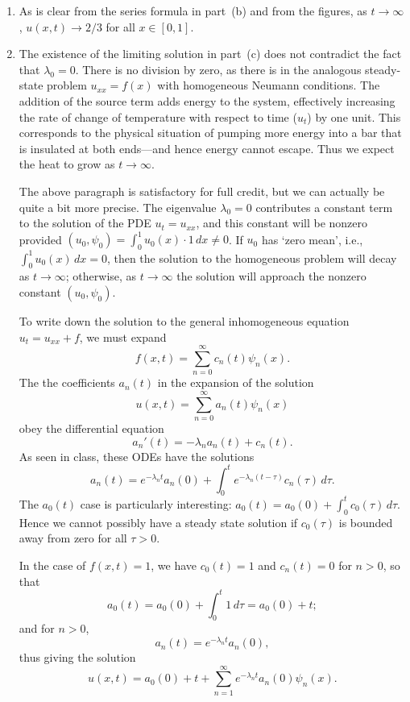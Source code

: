 {\begin{solution}
\begin{enumerate}
\item As is clear from the series formula in part~(b) and from the figures,
      as $t\to\infty$, $u(x,t) \to 2/3$ for all $x\in[0,1]$.

\item The existence of the limiting solution in part~(c) does not contradict
      the fact that $\lambda_0=0$.  There is no division by zero, as there is
      in the analogous steady-state problem $u_{xx} = f(x)$ with homogeneous
      Neumann conditions.  The addition of the source term adds energy to the
      system, effectively increasing the rate of change of temperature with 
      respect to time ($u_t$) by one unit.  
      This corresponds to the physical situation of pumping more
      energy into a bar that is insulated at both ends---and hence
      energy cannot escape.  Thus we expect the heat to grow as $t\to\infty$.

      The above paragraph is satisfactory for full credit, but we can actually
      be quite a bit more precise.  The eigenvalue $\lambda_0=0$ contributes
      a constant term to the solution of the PDE $u_t=u_{xx}$, and this constant 
      will be nonzero provided $(u_0,\psi_0) = \int_0^1 u_0(x)\cdot 1 \, dx \ne 0$.
      If $u_0$ has `zero mean', i.e., $\int_0^1 u_0(x)\,dx = 0$, then the solution
      to the homogeneous problem will decay as $t\to\infty$; otherwise, as $t\to\infty$
      the solution will approach the nonzero constant $(u_0,\psi_0)$.

      To write down the solution to the general inhomogeneous equation $u_t = u_{xx} + f$,
      we must expand
      \[ f(x,t) = \sum_{n=0}^\infty c_n(t) \psi_n(x).\]
      The the coefficients $a_n(t)$ in the expansion of the solution
      \[ u(x,t) = \sum_{n=0}^\infty a_n(t) \psi_n(x)\]
      obey the differential equation
      \[ a_n'(t) = -\lambda_n a_n(t) + c_n(t).\]
      As seen in class, these ODEs have the solutions
      \[ a_n(t) = e^{-\lambda_n t} a_n(0) + \int_0^t e^{-\lambda_n (t-\tau)} c_n(\tau)\,d\tau.\]
      The $a_0(t)$ case is particularly interesting: $a_0(t) = a_0(0) + \int_0^t c_0(\tau)\, d\tau$.
      Hence we cannot possibly have a steady state solution if $c_0(\tau)$ is bounded away from zero for all $\tau>0$.
 
      In the case of $f(x,t) = 1$, we have $c_0(t) = 1$ and $c_n(t) = 0$ for $n>0$, so that 
     \[ a_0(t) = a_0(0) + \int_0^t 1\, d\tau = a_0(0)+t;\]
      and for $n>0$,
     \[ a_n(t) = e^{-\lambda_n t}a_n(0),\]
      thus giving the solution
      \[ u(x,t) = a_0(0)+t + \sum_{n=1}^\infty e^{-\lambda_n t} a_n(0) \psi_n(x).\]
\end{enumerate}


\end{solution}}{}

